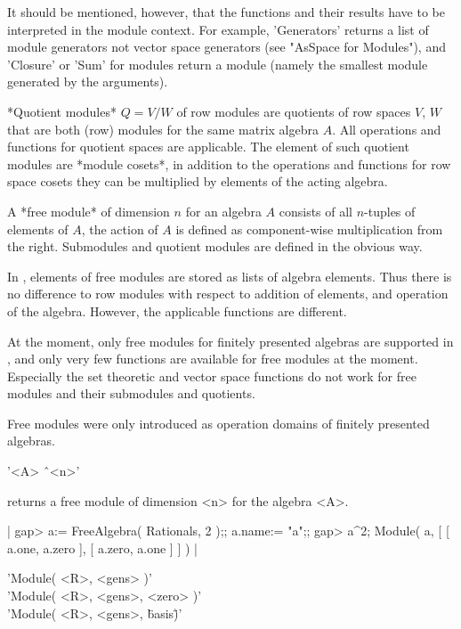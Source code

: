 It should be mentioned, however, that the functions and their results have to
be interpreted in the module context.  For example, 'Generators' returns a
list of module generators not vector space generators (see "AsSpace for
Modules"), and 'Closure' or 'Sum' for modules return a module (namely the
smallest module generated by the arguments).

*Quotient modules* $Q = V / W$ of row modules are quotients of row spaces
$V$, $W$ that are both (row) modules for the same matrix algebra $A$.
All operations and functions for quotient spaces are applicable.  
The element of such quotient modules are *module cosets*, in addition to
the operations and functions for row space cosets they can be multiplied
by elements of the acting algebra.


A *free module* of dimension $n$ for an algebra $A$ consists of all
$n$-tuples of elements of $A$, the action of $A$ is defined as
component-wise multiplication from the right.
Submodules and quotient modules are defined in the obvious way.

In {\GAP}, elements of free modules are stored as lists of algebra elements.
Thus there is no difference to row modules with respect to addition of
elements, and operation of the algebra.  However, the applicable functions
are different.

At the moment, only free modules for finitely presented algebras are
supported in {\GAP}, and only very few functions are available for free
modules at the moment.  Especially the set theoretic and vector space
functions do not work for free modules and their submodules and quotients.

Free modules were only introduced as operation domains of finitely
presented algebras.

\vspace{5mm}

'<A> \^\ <n>' 

returns a free module of dimension <n> for the algebra <A>.

|    gap> a:= FreeAlgebra( Rationals, 2 );; a.name:= "a";;
    gap> a^2;
    Module( a, [ [ a.one, a.zero ], [ a.zero, a.one ] ] ) |


'Module( <R>, <gens> )' \\
'Module( <R>, <gens>, <zero> )' \\
'Module( <R>, <gens>, \"basis\" )'

